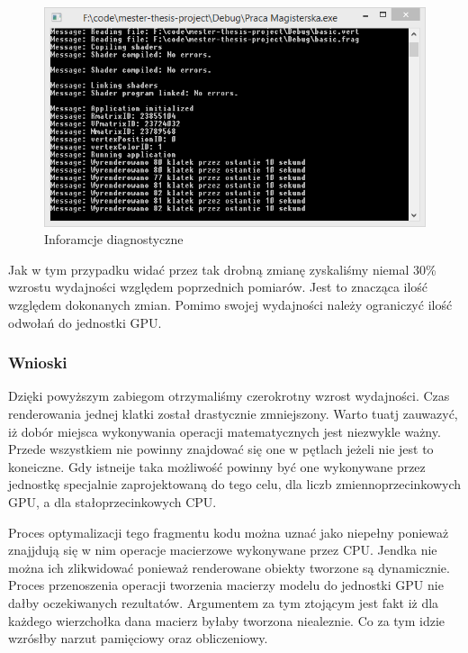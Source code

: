 \begin{figure}[h]
	\includegraphics[width=\textwidth]{images/optimized4_console}
	\caption{Inforamcje diagnostyczne}
\end{figure}

Jak w tym przypadku widać przez tak drobną zmianę zyskaliśmy niemal 30\% wzrostu wydajności względem poprzednich pomiarów. Jest to znacząca ilość względem dokonanych zmian. Pomimo swojej wydajności należy ograniczyć ilość odwołań do jednostki GPU.


\subsubsection{Wnioski}
\thispagestyle{empty}
\par\indent

Dzięki powyższym zabiegom otrzymaliśmy czerokrotny wzrost wydajności. Czas renderowania jednej klatki został drastycznie zmniejszony. Warto tuatj zauwazyć, iż dobór miejsca wykonywania operacji matematycznych jest niezwykle ważny. Przede wszystkiem nie powinny znajdować się one w pętlach jeżeli nie jest to koneiczne. Gdy istneije taka możliwość powinny być one wykonywane przez jednostkę specjalnie zaprojektowaną do tego celu, dla liczb zmiennoprzecinkowych GPU, a dla stałoprzecinkowych CPU.

Proces optymalizacji tego fragmentu kodu można uznać jako niepełny ponieważ znajjdują się w nim operacje macierzowe wykonywane przez CPU. Jendka nie można ich zlikwidować ponieważ renderowane obiekty tworzone są dynamicznie. Proces przenoszenia operacji tworzenia  macierzy modelu do jednostki GPU nie dałby oczekiwanych rezultatów. Argumentem za tym ztojącym jest fakt iż dla każdego wierzchołka dana macierz byłaby tworzona niealeznie. Co za tym idzie wzrósłby narzut pamięciowy oraz obliczeniowy.
